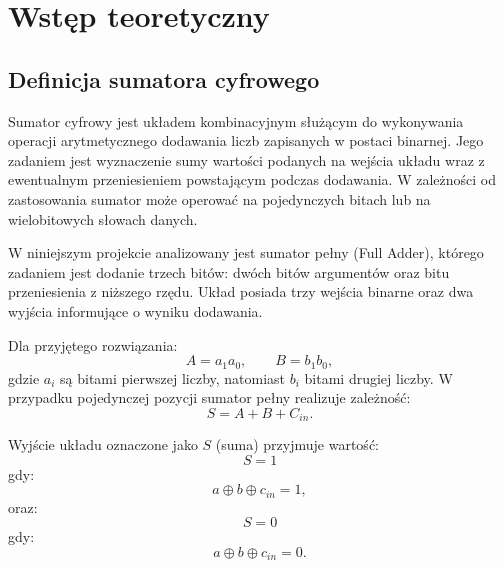 %   

\section{Wstęp teoretyczny}

\subsection{Definicja sumatora cyfrowego}

Sumator cyfrowy jest układem kombinacyjnym służącym do wykonywania operacji arytmetycznego dodawania liczb zapisanych w postaci binarnej. Jego zadaniem jest wyznaczenie sumy wartości podanych na wejścia układu wraz z ewentualnym przeniesieniem powstającym podczas dodawania. W zależności od zastosowania sumator może operować na pojedynczych bitach lub na wielobitowych słowach danych.

W niniejszym projekcie analizowany jest sumator pełny (Full Adder), którego zadaniem jest dodanie trzech bitów: dwóch bitów argumentów oraz bitu przeniesienia z niższego rzędu. Układ posiada trzy wejścia binarne oraz dwa wyjścia informujące o wyniku dodawania.

Dla przyjętego rozwiązania:
\begin{equation*}
A = a_1a_0, \qquad B = b_1b_0,
\end{equation*}
gdzie $a_i$ są bitami pierwszej liczby, natomiast $b_i$ bitami drugiej liczby. W przypadku pojedynczej pozycji sumator pełny realizuje zależność:
\begin{equation*}
S = A + B + C_{in}.
\end{equation*}

Wyjście układu oznaczone jako $S$ (suma) przyjmuje wartość:
\begin{equation*}
S = 1
\end{equation*}
gdy:
\begin{equation*}
a \oplus b \oplus c_{in} = 1,
\end{equation*}
oraz:
\begin{equation*}
S = 0
\end{equation*}
gdy:
\begin{equation*}
a \oplus b \oplus c_{in} = 0.
\end{equation*}

